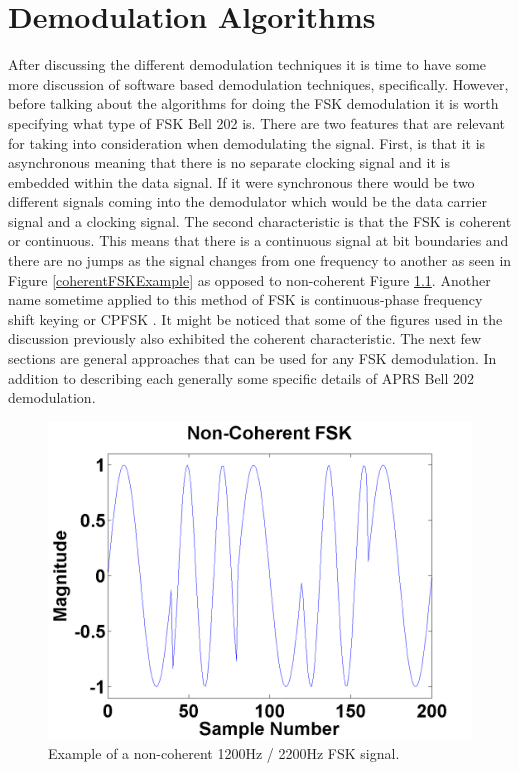 \chapter{Demodulation Algorithms}
After discussing the different demodulation techniques it is time to have some more discussion of software based demodulation techniques, specifically. However, before talking about the algorithms for doing the FSK demodulation it is worth specifying what type of FSK Bell 202 is. There are two features that are relevant for taking into consideration when demodulating the signal. First, is that it is asynchronous meaning that there is no separate clocking signal and it is embedded within the data signal. If it were synchronous there would be two different signals coming into the demodulator which would be the data carrier signal and a clocking signal. The second characteristic is that the FSK is coherent or continuous. This means that there is a continuous signal at bit boundaries and there are no jumps as the signal changes from one frequency to another as seen in Figure \ref{coherentFSKExample} as opposed to non-coherent Figure \ref{noncoherentFSKExample}. Another name sometime applied to this method of FSK is continuous-phase frequency shift keying or CPFSK \cite{WikipediaCPFSK}. It might be noticed that some of the figures used in the discussion previously also exhibited the coherent characteristic. The next few sections are general approaches that can be used for any FSK demodulation. In addition to describing each generally some specific details of APRS Bell 202 demodulation. 
\begin{figure}
  \centering
	\includegraphics[width=0.75\linewidth]{images/NonCoherentFSK.png} 
	\caption{Example of a non-coherent 1200Hz / 2200Hz FSK signal.}
   \label{noncoherentFSKExample}
\end{figure}
